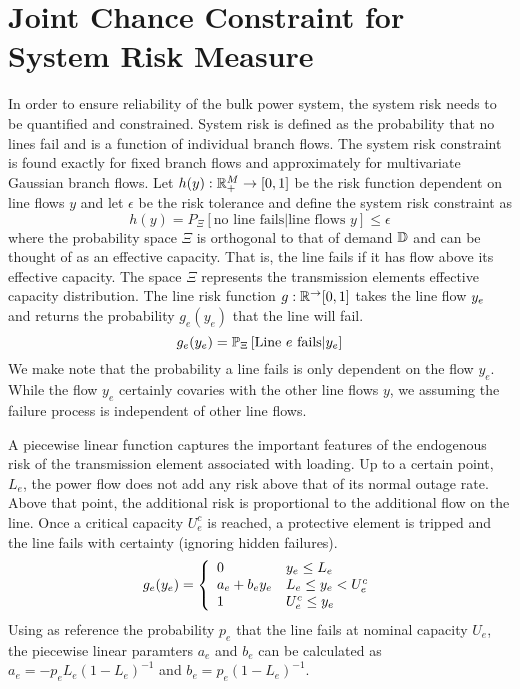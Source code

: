 \section{Joint Chance Constraint for System Risk Measure} \label{jointchanceconstraint}
In order to ensure reliability of the bulk power system, the system risk needs to be quantified and constrained. System risk is defined as the probability that no lines fail and is a function of individual branch flows.  The system risk constraint is found exactly for fixed branch flows and approximately for  multivariate Gaussian branch flows.  Let $h(y) : \mathbb{R}^{M}_+ \rightarrow \left[ 0, 1 \right]$ be the risk function dependent on line flows $y$ and let $\epsilon$ be the risk tolerance and define the system risk constraint as
\begin{equation}\label{systemriskmeasure}
h(y) = P_\Xi \left[ \mbox{no line fails} | \mbox{line flows } y\right] \leq \epsilon
\end{equation}
where the probability space $\Xi$ is orthogonal to that of demand $\mathbb{D}$ and can be thought of as an effective capacity.  That is, the line fails if it has flow above its effective capacity.  The space $\Xi$ represents the transmission elements effective capacity distribution.  The line risk function $g : \mathbb{R}^{\rightarrow} [0,1]$ takes the line flow $y_e$ and returns the probability $g_e(y_e)$ that the line will fail.   
\begin{equation}
 g_e(y_e) = \mathbb{P}_{\Xi} \left[ \text{Line }e\text{ fails} | y_e \right] 
\end{equation}
We make note that the probability a line fails is only dependent on the flow $y_e$.  While the flow $y_e$ certainly covaries with the other line flows $y$, we assuming the failure process is independent of other line flows.


A piecewise linear function captures the important features of the endogenous risk of the transmission element associated with loading.  Up to a certain point, $L_e$, the power flow does not add any risk above that of its normal outage rate.  Above that point, the additional risk is proportional to the additional flow on the line.  Once a critical capacity $U_e^c$ is reached, a protective element is tripped and the line fails with certainty (ignoring hidden failures).  
\begin{equation}\label{pwl_risk}
g_e(y_e) = \left\{ \begin{array}{l l}
  0 & y_e \leq L_e \\
  a_e + b_e y_e & L_e \leq y_e < U_e^c \\
  1 & U_e^c \leq y_e 
\end{array}
\right.
\end{equation}
Using as reference the probability $p_e$ that the line fails at nominal capacity $U_e$, the piecewise linear paramters $a_e$ and $b_e$ can be calculated as $a_e = -p_eL_e (1-L_e)^{-1}$ and  $b_e = p_e(1-L_e)^{-1}$.




